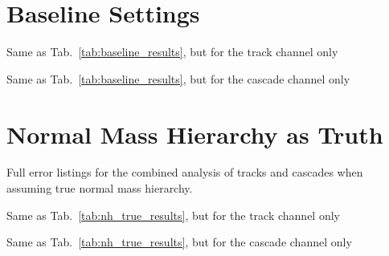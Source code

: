 \section*{\label{app:fisher_baseline}\thesection\enskip
Baseline Settings}

\begin{table}[h!]
 \caption{Same as Tab.~\ref{tab:baseline_results}, but for the track channel
  only}
 \begin{center}
  \small{}
 \end{center}
\end{table}

\begin{table}[h!]
 \caption{Same as Tab.~\ref{tab:baseline_results}, but for the cascade channel
  only}
 \begin{center}
  \small{}
 \end{center}
\end{table}

\FloatBarrier
\section*{\label{app:fisher_nhtrue}
\thesection\enskip Normal Mass Hierarchy as Truth}

\begin{table}[h!]
 \caption{Full error listings for the combined analysis of tracks and cascades
  when assuming true normal mass hierarchy.}
 \label{tab:nh_true_results}
 \begin{center}
  \small{}
 \end{center}
\end{table}

\begin{table}[h!]
 \caption{Same as Tab.~\ref{tab:nh_true_results}, but for the track channel
  only}
 \begin{center}
  \small{}
 \end{center}
\end{table}

\begin{table}[h!]
 \caption{Same as Tab.~\ref{tab:nh_true_results}, but for the cascade channel
  only}
 \begin{center}
  \small{}
 \end{center}
\end{table}


